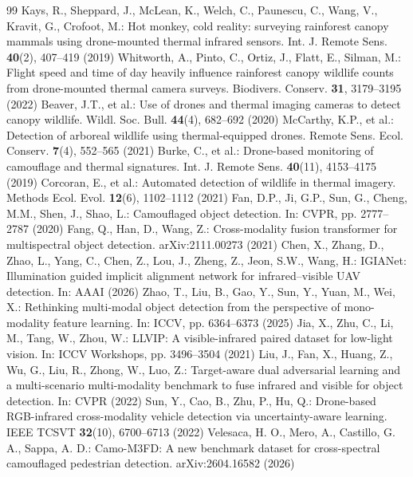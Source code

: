 \documentclass[runningheads]{llncs}
\begin{document}
\begin{thebibliography}{99}
 Kays, R., Sheppard, J., McLean, K., Welch, C., Paunescu, C., Wang, V., Kravit, G., Crofoot, M.: Hot monkey, cold reality: surveying rainforest canopy mammals using drone-mounted thermal infrared sensors. Int. J. Remote Sens. \textbf{40}(2), 407--419 (2019)
 Whitworth, A., Pinto, C., Ortiz, J., Flatt, E., Silman, M.: Flight speed and time of day heavily influence rainforest canopy wildlife counts from drone-mounted thermal camera surveys. Biodivers. Conserv. \textbf{31}, 3179--3195 (2022)
 Beaver, J.T., et al.: Use of drones and thermal imaging cameras to detect canopy wildlife. Wildl. Soc. Bull. \textbf{44}(4), 682--692 (2020)
 McCarthy, K.P., et al.: Detection of arboreal wildlife using thermal-equipped drones. Remote Sens. Ecol. Conserv. \textbf{7}(4), 552--565 (2021)
 Burke, C., et al.: Drone-based monitoring of camouflage and thermal signatures. Int. J. Remote Sens. \textbf{40}(11), 4153--4175 (2019)
 Corcoran, E., et al.: Automated detection of wildlife in thermal imagery. Methods Ecol. Evol. \textbf{12}(6), 1102--1112 (2021)
 Fan, D.P., Ji, G.P., Sun, G., Cheng, M.M., Shen, J., Shao, L.: Camouflaged object detection. In: CVPR, pp. 2777--2787 (2020)
 Fang, Q., Han, D., Wang, Z.: Cross-modality fusion transformer for multispectral object detection. arXiv:2111.00273 (2021)
 Chen, X., Zhang, D., Zhao, L., Yang, C., Chen, Z., Lou, J., Zheng, Z., Jeon, S.W., Wang, H.: IGIANet: Illumination guided implicit alignment network for infrared--visible UAV detection. In: AAAI (2026)
 Zhao, T., Liu, B., Gao, Y., Sun, Y., Yuan, M., Wei, X.: Rethinking multi-modal object detection from the perspective of mono-modality feature learning. In: ICCV, pp. 6364--6373 (2025)
 Jia, X., Zhu, C., Li, M., Tang, W., Zhou, W.: LLVIP: A visible-infrared paired dataset for low-light vision. In: ICCV Workshops, pp. 3496--3504 (2021)
 Liu, J., Fan, X., Huang, Z., Wu, G., Liu, R., Zhong, W., Luo, Z.: Target-aware dual adversarial learning and a multi-scenario multi-modality benchmark to fuse infrared and visible for object detection. In: CVPR (2022)
 Sun, Y., Cao, B., Zhu, P., Hu, Q.: Drone-based RGB-infrared cross-modality vehicle detection via uncertainty-aware learning. IEEE TCSVT \textbf{32}(10), 6700--6713 (2022)
 Velesaca, H. O., Mero, A., Castillo, G. A., Sappa, A. D.: Camo-M3FD: A new benchmark dataset for cross-spectral camouflaged pedestrian detection. arXiv:2604.16582 (2026)

\end{thebibliography}
\end{document}
